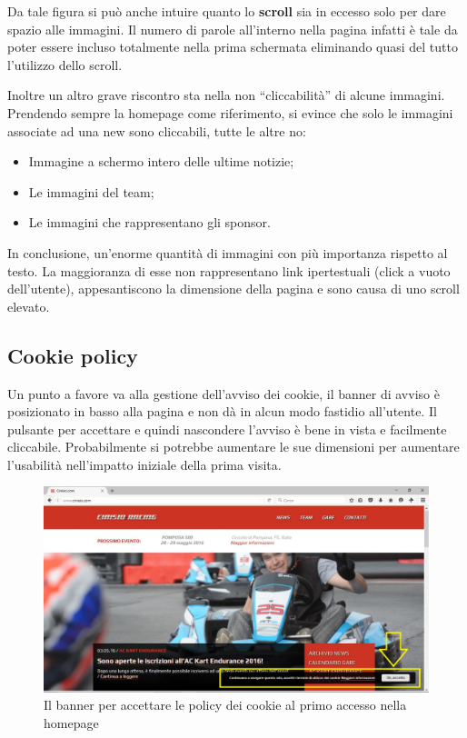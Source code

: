 		\newpage
		Da tale figura si può anche intuire quanto lo \textbf{scroll} sia in eccesso solo per dare spazio alle immagini. Il numero di parole all'interno nella pagina infatti è tale da poter essere incluso totalmente nella prima schermata eliminando quasi del tutto l'utilizzo dello scroll.
		
		Inoltre un altro grave riscontro sta nella non ``cliccabilità'' di alcune immagini. Prendendo sempre la homepage come riferimento, si evince che solo le immagini associate ad una new sono cliccabili, tutte le altre no: 
		\begin{itemize}
			\item Immagine a schermo intero delle ultime notizie;
			\item Le immagini del team;
			\item Le immagini che rappresentano gli sponsor.
		\end{itemize}
	
	In conclusione, un'enorme quantità di immagini con più importanza rispetto al testo. La maggioranza di esse non rappresentano link ipertestuali (click a vuoto dell'utente), appesantiscono la dimensione della pagina e sono causa di uno scroll elevato.
	
	\newpage
	\subsection{Cookie policy}
		Un punto a favore va alla gestione dell'avviso dei cookie, il banner di avviso è posizionato in basso alla pagina e non dà in alcun modo fastidio all'utente. Il pulsante per accettare e quindi nascondere l'avviso è bene in vista e facilmente cliccabile. Probabilmente si potrebbe aumentare le sue dimensioni per aumentare l'usabilità nell'impatto iniziale della prima visita.
		 
		\begin{figure} [h]
			\includegraphics[width=\textwidth]{images/CookiePopUp}
			\caption{Il banner per accettare le policy dei cookie al primo accesso nella homepage}
			\label{fig:CookiePopUp}
		\end{figure}
		 	
